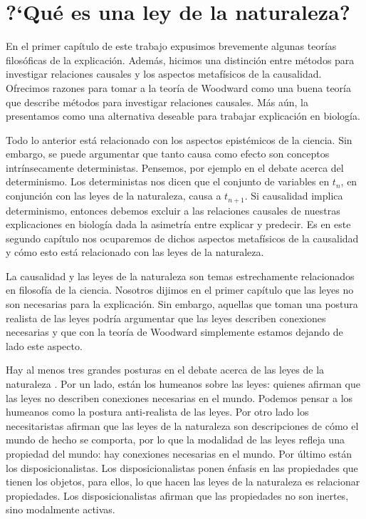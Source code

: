 
\chapter{?`Qué es una ley de la naturaleza?}

\noindent En el primer capítulo de este trabajo expusimos brevemente algunas teorías filosóficas de la explicación. Además, hicimos una distinción entre métodos para investigar relaciones causales y los aspectos metafísicos de la causalidad. Ofrecimos razones para tomar a la teoría de Woodward como una buena teoría que describe métodos para investigar relaciones causales. Más aún, la presentamos como una alternativa deseable para trabajar explicación en biología.

Todo lo anterior está relacionado con los aspectos epistémicos de la ciencia. Sin embargo, se puede argumentar que tanto causa como efecto son conceptos intrínsecamente deterministas. Pensemos, por ejemplo en el debate acerca del determinismo. Los deterministas nos dicen que el conjunto de variables en $t_{n}$, en conjunción con las leyes de la naturaleza, causa a $t_{n+1}$. Si causalidad implica determinismo, entonces debemos excluir a las relaciones causales de nuestras explicaciones en biología dada la asimetría entre explicar y predecir. Es en este segundo capítulo nos ocuparemos de dichos aspectos metafísicos de la causalidad y cómo esto está relacionado con las leyes de la naturaleza.

La causalidad y las leyes de la naturaleza son temas estrechamente relacionados en filosofía de la ciencia. Nosotros dijimos en el primer capítulo que las leyes no son necesarias para la explicación. Sin embargo, aquellas que toman una postura realista de las leyes podría argumentar que las leyes describen conexiones necesarias y que con la teoría de Woodward simplemente estamos dejando de lado este aspecto.

Hay al menos tres grandes posturas en el debate acerca de las leyes de la naturaleza \cite{Borge2019}. Por un lado, están los humeanos sobre las leyes: quienes afirman que las leyes no describen conexiones necesarias en el mundo. Podemos pensar a los humeanos como la postura anti-realista de las leyes. Por otro lado los necesitaristas afirman que las leyes de la naturaleza son descripciones de cómo el mundo de hecho se comporta, por lo que la modalidad de las leyes refleja una propiedad del mundo: hay conexiones necesarias en el mundo. Por último están los disposicionalistas. Los disposicionalistas ponen énfasis en las propiedades que tienen los objetos, para ellos, lo que hacen las leyes de la naturaleza es relacionar propiedades. Los disposicionalistas afirman que las propiedades no son inertes, sino modalmente activas.

